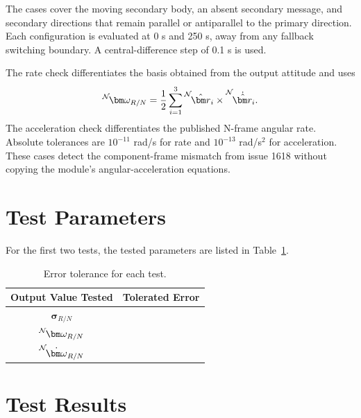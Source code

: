 The cases cover the moving secondary body, an absent secondary message, and secondary directions that remain parallel or antiparallel to the primary direction. Each configuration is evaluated at 0 s and 250 s, away from any fallback switching boundary. A central-difference step of 0.1 s is used.

The rate check differentiates the basis obtained from the output attitude and uses
\[
    \leftexp{N}{\bm\omega_{R/N}}
      = \frac{1}{2}\sum_{i=1}^{3}
        \leftexp{N}{\hat{\bm r}_i}\times\leftexp{N}{\dot{\hat{\bm r}}_i}.
\]
The acceleration check differentiates the published N-frame angular rate. Absolute tolerances are $10^{-11}$ rad/s for rate and $10^{-13}$ rad/s$^2$ for acceleration. These cases detect the component-frame mismatch from issue 1618 without copying the module's angular-acceleration equations.

\section{Test Parameters}
For the first two tests, the tested parameters are listed in Table~\ref{tab:errortol}.
\begin{table}[htbp]
	\caption{Error tolerance for each test.}
	\label{tab:errortol}
	\centering \fontsize{10}{10}\selectfont
	\begin{tabular}{ c | c } %
		\hline\hline
		\textbf{Output Value Tested}  & \textbf{Tolerated Error}  \\
		\hline
		$\bm\sigma_{R/N}$     		        	     &   \\
		$\leftexp{N}{\bm\omega_{R/N}}$            &   \\
		$\leftexp{N}{\dot{\bm \omega}_{R/N}}$   & \\
		\hline\hline
	\end{tabular}
\end{table}




\section{Test Results}

